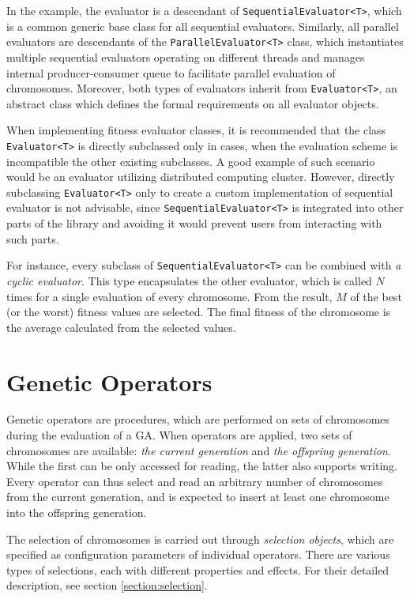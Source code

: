 In the example, the evaluator is a descendant of \texttt{SequentialEvaluator<T>}, which is a common generic base class for all sequential evaluators. Similarly, all parallel evaluators are descendants of the \texttt{ParallelEvaluator<T>} class, which instantiates multiple sequential evaluators operating on different threads and manages internal producer-consumer queue to facilitate parallel evaluation of chromosomes. Moreover, both types of evaluators inherit from \texttt{Evaluator<T>}, an abstract class which defines the formal requirements on all evaluator objects.

When implementing fitness evaluator classes, it is recommended that the class \texttt{Evaluator<T>} is directly subclassed only in cases, when the evaluation scheme is incompatible the other existing subclasses. A good example of such scenario would be an evaluator utilizing distributed computing cluster. However, directly subclassing \texttt{Evaluator<T>} only to create a custom implementation of sequential evaluator is not advisable, since \texttt{SequentialEvaluator<T>} is integrated into other parts of the library and avoiding it would prevent users from interacting with such parts.

For instance, every subclass of \texttt{SequentialEvaluator<T>} can be combined with \textit{a cyclic evaluator}. This type encapsulates the other evaluator, which is called $N$ times for a single evaluation of every chromosome. From the result, $M$ of the best (or the worst) fitness values are selected. The final fitness of the chromosome is the average calculated from the selected values.

\section{Genetic Operators}\label{section:genetic-operators}
Genetic operators are procedures, which are performed on sets of chromosomes during the evaluation of a GA. When operators are applied, two sets of chromosomes are available: \textit{the current generation} and \textit{the offspring generation}. While the first can be only accessed for reading, the latter also supports writing. Every operator can thus select and read an arbitrary number of chromosomes from the current generation, and is expected to insert at least one chromosome into the offspring generation.

The selection of chromosomes is carried out through \textit{selection objects}, which are specified as configuration parameters of individual operators. There are various types of selections, each with different properties and effects. For their detailed description, see section \ref{section:selection}.


